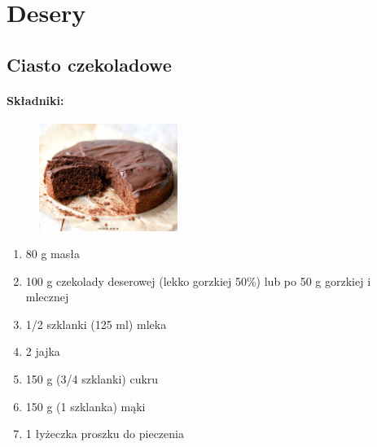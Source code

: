 \documentclass{article}
\begin{document}
    \section{Desery}
    \medskip
    \subsection{Ciasto czekoladowe}
    \bigskip

    \paragraph{Składniki:}
    \begin{figure}
        \includegraphics[width=0.4\textwidth]{ciasto_czekoladowe.jpg}
    \end{figure}
    \begin{enumerate}
        \item 80 g masła
        \item 100 g czekolady deserowej (lekko gorzkiej 50\%) lub po 50 g
            gorzkiej i mlecznej
        \item 1/2 szklanki (125 ml) mleka
        \item 2 jajka
        \item 150 g (3/4 szklanki) cukru
        \item 150 g (1 szklanka) mąki
        \item 1 łyżeczka proszku do pieczenia
    \end{enumerate}
\end{document}
